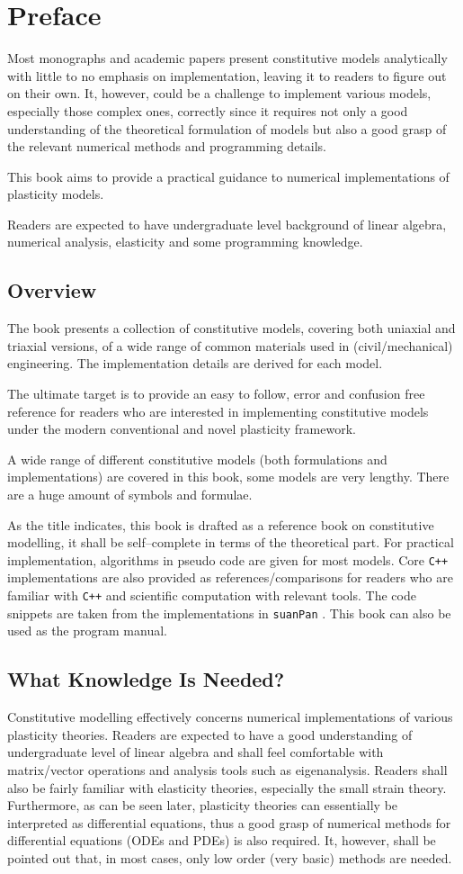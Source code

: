 \chapter{Preface}
Most monographs and academic papers present constitutive models analytically with little to no emphasis on implementation, leaving it to readers to figure out on their own.
It, however, could be a challenge to implement various models, especially those complex ones, correctly since it requires not only a good understanding of the theoretical formulation of models but also a good grasp of the relevant numerical methods and programming details.

This book aims to provide a practical guidance to numerical implementations of plasticity models.

Readers are expected to have undergraduate level background of linear algebra, numerical analysis, elasticity and some programming knowledge.
\section{Overview}
The book presents a collection of constitutive models, covering both uniaxial and triaxial versions, of a wide range of common materials used in (civil/mechanical) engineering.
The implementation details are derived for each model.

The ultimate target is to provide an easy to follow, error and confusion free reference for readers who are interested in implementing constitutive models under the modern conventional and novel plasticity framework.

A wide range of different constitutive models (both formulations and implementations) are covered in this book, some models are very lengthy.
There are a huge amount of symbols and formulae.

As the title indicates, this book is drafted as a reference book on constitutive modelling, it shall be self--complete in terms of the theoretical part.
For practical implementation, algorithms in pseudo code are given for most models.
Core \texttt{C++} implementations are also provided as references/comparisons for readers who are familiar with \texttt{C++} and scientific computation with relevant tools.
The code snippets are taken from the implementations in \texttt{suanPan} \cite{Chang2022}.
This book can also be used as the program manual.
\section{What Knowledge Is Needed?}
Constitutive modelling effectively concerns numerical implementations of various plasticity theories.
Readers are expected to have a good understanding of undergraduate level of linear algebra and shall feel comfortable with matrix/vector operations and analysis tools such as eigenanalysis.
Readers shall also be fairly familiar with elasticity theories, especially the small strain theory.
Furthermore, as can be seen later, plasticity theories can essentially be interpreted as differential equations, thus a good grasp of numerical methods for differential equations (ODEs and PDEs) is also required.
It, however, shall be pointed out that, in most cases, only low order (very basic) methods are needed.

